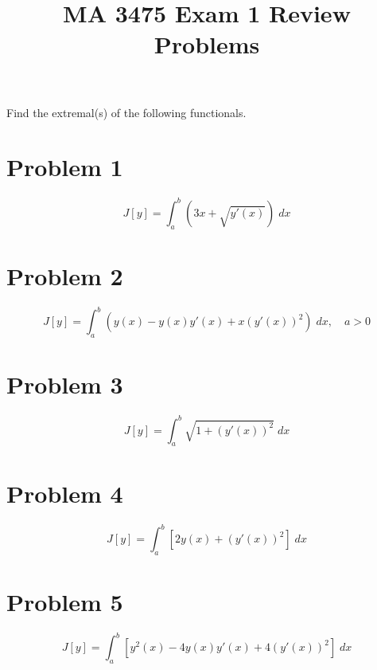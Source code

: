 \documentclass[a4paper]{article}
\title{MA 3475 Exam 1 Review Problems}
\begin{document}
\maketitle
Find the extremal(s) of the following functionals.

\section*{Problem 1}
$$J[y] = \int_a^b \left(3x + \sqrt{y'(x)}\right) \; dx $$


\section*{Problem 2}

$$J[y] = \int_a^b \left(y(x) - y(x)y'(x) + x(y'(x))^2\right) \; dx,\quad a > 0 $$


\section*{Problem 3}

$$J[y] = \int_a^b \sqrt{1+(y'(x))^2} \; dx $$



\section*{Problem 4}

$$J[y] = \int_a^b \left[2y(x) + (y'(x))^2\right] \; dx $$


\section*{Problem 5}

$$J[y] = \int_a^b \left[y^2(x) -4y(x)y'(x) + 4(y'(x))^2\right] \; dx $$
\end{document}
